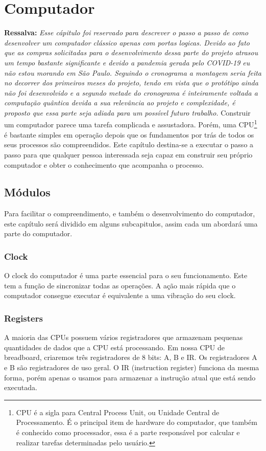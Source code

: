 \section{Computador} 
\textbf{Ressalva: }
\textit{ Esse cápitulo foi reservado para descrever o passo a passo de como desenvolver um computador clássico apenas com portas logicas. Devido ao fato que as compras solicitadas para o desenvolvimento dessa parte do projeto atrasou um tempo  bastante significante e devido a pandemia gerada pelo COVID-19 eu não estou morando em São Paulo. Seguindo o cronograma a montagem seria feita no decorrer dos primeiros meses do projeto, tendo em vista que o protótipo ainda não foi desenvolvido e a segundo metade do cronograma é inteiramente voltada a computação quântica devida a sua relevância ao projeto e complexidade, é proposto que essa parte seja adiada para um possível futuro trabalho.}
\newline
\newline
Construir um computador parece uma tarefa complicada e assustadora. Porém, uma CPU\footnote{CPU é a sigla para Central Process Unit, ou Unidade Central de Processamento. É o principal item de hardware do computador, que também é conhecido como processador, essa é a parte responsável por calcular e realizar tarefas determinadas pelo usuário.} é bastante simples em operação depois que os fundamentos por trás de todos os seus processos são compreendidos. Este capítulo destina-se a executar o passo a passo para que qualquer pessoa interessada seja capaz em construir seu próprio computador e obter o conhecimento que acompanha o processo.

\subsection{Módulos}
Para facilitar o compreendimento, e também o desenvolvimento do computador, este capítulo será dividido em alguns subcapitulos, assim cada um abordará uma parte do computador. 

\subsubsection{Clock}
O clock do computador é uma parte essencial para o seu funcionamento. Este tem a função de sincronizar todas as operações. A ação mais rápida que o computador consegue executar é equivalente a uma vibração do seu clock.

\subsubsection{Registers}
A maioria das CPUs possuem vários registradores que armazenam pequenas quantidades de dados que a CPU está processando. Em nossa CPU de breadboard, criaremos três registradores de 8 bits: A, B e IR. Os registradores A e B são registradores de uso geral. O IR (instruction register) funciona da mesma forma, porém apenas o usamos para armazenar a instrução atual que está sendo executada.

